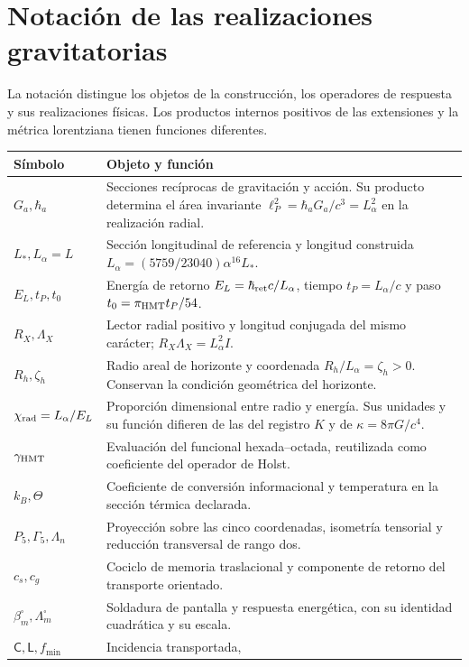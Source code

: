 \begingroup\fontsize{9.3}{10.7}\selectfont\setlength{\parskip}{1pt}
\section{Notación de las realizaciones gravitatorias}
La notación distingue los objetos de la construcción, los operadores
de respuesta y sus realizaciones físicas. Los productos internos positivos
de las extensiones y la métrica lorentziana tienen funciones diferentes.
\renewcommand{\arraystretch}{1.0}\begin{longtable}{@{}p{.23\linewidth}p{.72\linewidth}@{}}
\toprule
Símbolo & Objeto y función\\ \midrule
\endhead
\(G_a,\hbar_a\) & Secciones recíprocas de gravitación y acción.
Su producto determina el área invariante
\(\ell_P^2=\hbar_aG_a/c^3=L_\alpha^2\) en la realización radial.\\
\(L_*,L_\alpha=L\) & Sección longitudinal de referencia y longitud
construida \(L_\alpha=(5759/23040)\alpha^{16}L_*\).\\
\(E_L,t_P,t_0\) & Energía de retorno \(E_L=\hbar_{\rm ret}c/L_\alpha\),
tiempo \(t_P=L_\alpha/c\) y paso \(t_0=\pi_{\rm HMT}t_P/54\).\\
\(R_X,\Lambda_X\) & Lector radial positivo y longitud conjugada del
mismo carácter; \(R_X\Lambda_X=L_\alpha^2I\).\\
\(R_h,\zeta_h\) & Radio areal de horizonte y coordenada
\(R_h/L_\alpha=\zeta_h>0\). Conservan la condición geométrica del horizonte.\\
\(\chi_{\rm rad}=L_\alpha/E_L\) & Proporción dimensional entre radio
y energía. Sus unidades y su función difieren de las del registro \(K\)
y de \(\kappa=8\pi G/c^4\).\\
\(\gamma_{\rm HMT}\) & Evaluación del funcional hexada--octada,
reutilizada como coeficiente del operador de Holst.\\
\(k_B,\Theta\) & Coeficiente de conversión informacional y temperatura
en la sección térmica declarada.\\
\(P_5,\Gamma_5,\Lambda_n\) & Proyección sobre las cinco coordenadas,
isometría tensorial y reducción transversal de rango dos.\\
\(c_s,c_g\) & Cociclo de memoria traslacional y componente de retorno
del transporte orientado.\\
\(\beta_m^\square,\Lambda_m^\square\) & Soldadura de pantalla y
respuesta energética, con su identidad cuadrática y su escala.\\
\(\mathsf C,\mathsf L,f_{\min}\) & Incidencia transportada,

\end{longtable}
